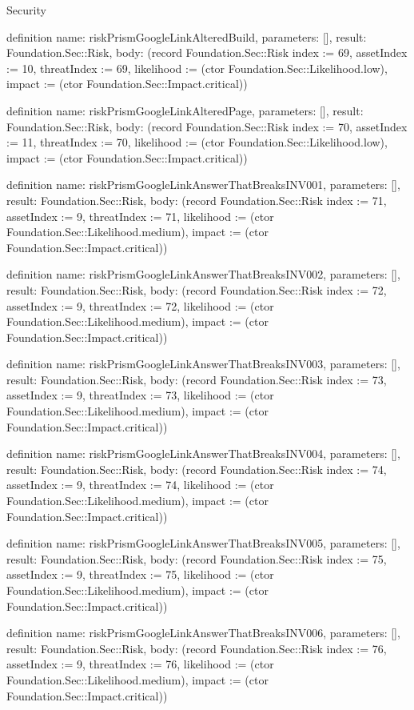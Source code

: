 \begin{lexlean}{Security}
\begin{semanticmodule}
definition{
  name: riskPrismGoogleLinkAlteredBuild,
  parameters: [],
  result: Foundation.Sec::Risk,
  body: (record Foundation.Sec::Risk {index := 69, assetIndex := 10, threatIndex := 69, likelihood := (ctor Foundation.Sec::Likelihood.low), impact := (ctor Foundation.Sec::Impact.critical)})
}

definition{
  name: riskPrismGoogleLinkAlteredPage,
  parameters: [],
  result: Foundation.Sec::Risk,
  body: (record Foundation.Sec::Risk {index := 70, assetIndex := 11, threatIndex := 70, likelihood := (ctor Foundation.Sec::Likelihood.low), impact := (ctor Foundation.Sec::Impact.critical)})
}

definition{
  name: riskPrismGoogleLinkAnswerThatBreaksINV001,
  parameters: [],
  result: Foundation.Sec::Risk,
  body: (record Foundation.Sec::Risk {index := 71, assetIndex := 9, threatIndex := 71, likelihood := (ctor Foundation.Sec::Likelihood.medium), impact := (ctor Foundation.Sec::Impact.critical)})
}

definition{
  name: riskPrismGoogleLinkAnswerThatBreaksINV002,
  parameters: [],
  result: Foundation.Sec::Risk,
  body: (record Foundation.Sec::Risk {index := 72, assetIndex := 9, threatIndex := 72, likelihood := (ctor Foundation.Sec::Likelihood.medium), impact := (ctor Foundation.Sec::Impact.critical)})
}

definition{
  name: riskPrismGoogleLinkAnswerThatBreaksINV003,
  parameters: [],
  result: Foundation.Sec::Risk,
  body: (record Foundation.Sec::Risk {index := 73, assetIndex := 9, threatIndex := 73, likelihood := (ctor Foundation.Sec::Likelihood.medium), impact := (ctor Foundation.Sec::Impact.critical)})
}

definition{
  name: riskPrismGoogleLinkAnswerThatBreaksINV004,
  parameters: [],
  result: Foundation.Sec::Risk,
  body: (record Foundation.Sec::Risk {index := 74, assetIndex := 9, threatIndex := 74, likelihood := (ctor Foundation.Sec::Likelihood.medium), impact := (ctor Foundation.Sec::Impact.critical)})
}

definition{
  name: riskPrismGoogleLinkAnswerThatBreaksINV005,
  parameters: [],
  result: Foundation.Sec::Risk,
  body: (record Foundation.Sec::Risk {index := 75, assetIndex := 9, threatIndex := 75, likelihood := (ctor Foundation.Sec::Likelihood.medium), impact := (ctor Foundation.Sec::Impact.critical)})
}

definition{
  name: riskPrismGoogleLinkAnswerThatBreaksINV006,
  parameters: [],
  result: Foundation.Sec::Risk,
  body: (record Foundation.Sec::Risk {index := 76, assetIndex := 9, threatIndex := 76, likelihood := (ctor Foundation.Sec::Likelihood.medium), impact := (ctor Foundation.Sec::Impact.critical)})
}


\end{semanticmodule}
\end{lexlean}
